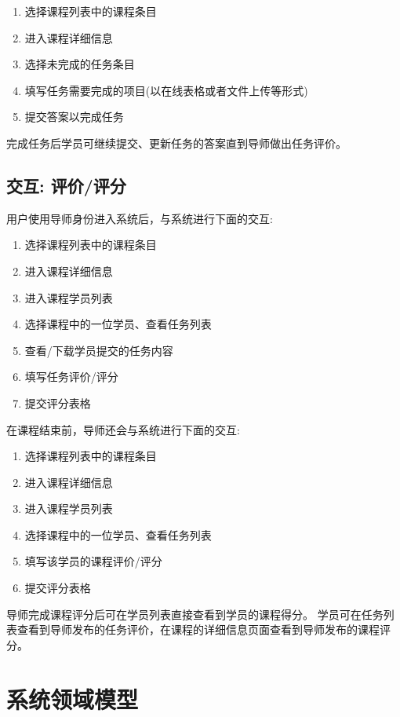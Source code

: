 \begin{enumerate}
  \item 选择课程列表中的课程条目
  \item 进入课程详细信息
  \item 选择未完成的任务条目
  \item 填写任务需要完成的项目(以在线表格或者文件上传等形式)
  \item 提交答案以完成任务
\end{enumerate}

完成任务后学员可继续提交、更新任务的答案直到导师做出任务评价。

\subsection {交互: 评价/评分}

用户使用导师身份进入系统后，与系统进行下面的交互:

\begin{enumerate}
  \item 选择课程列表中的课程条目
  \item 进入课程详细信息
  \item 进入课程学员列表
  \item 选择课程中的一位学员、查看任务列表
  \item 查看/下载学员提交的任务内容
  \item 填写任务评价/评分
  \item 提交评分表格
\end{enumerate}

在课程结束前，导师还会与系统进行下面的交互:

\begin{enumerate}
  \item 选择课程列表中的课程条目
  \item 进入课程详细信息
  \item 进入课程学员列表
  \item 选择课程中的一位学员、查看任务列表
  \item 填写该学员的课程评价/评分
  \item 提交评分表格
\end{enumerate}

导师完成课程评分后可在学员列表直接查看到学员的课程得分。 学员可在任务列表查看到导师发布的任务评价，在课程的详细信息页面查看到导师发布的课程评分。

\newpage

\section{系统领域模型}

